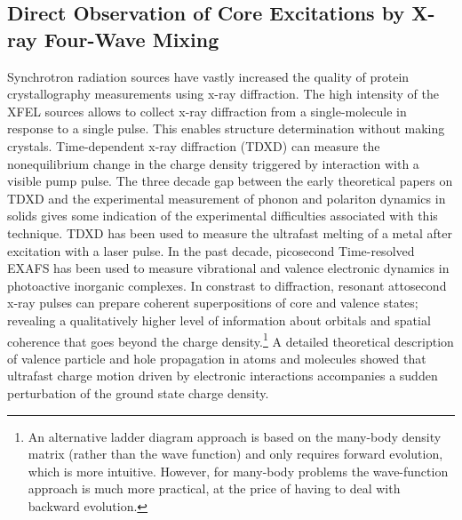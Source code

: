 \documentclass{ar-1col}
\begin{document}
\subsection{Direct Observation of Core Excitations by X-ray Four-Wave Mixing}
Synchrotron radiation sources have
vastly increased the quality of protein crystallography measurements
using x-ray diffraction.\cite{deisenhofer_structure_1985} The high
intensity of the XFEL sources allows to collect x-ray diffraction
from a single-molecule in response to a single pulse. This enables
structure determination without making crystals.\cite{chapman_femtosecond_2011} Time-dependent x-ray diffraction
(TDXD) can measure the nonequilibrium change in the charge density
triggered by interaction with a visible pump pulse.\cite{bargheer_coherent_2004,elsaesser_transient_2012} The three
decade gap between the early theoretical papers on
TDXD\cite{freund_optically_1970,eisenberger_mixing_1971,woo_inelastic_1972,freund_nonlinear_1972a}
and the experimental measurement of
phonon\cite{lindenberg_time-resolved_2000} and
polariton\cite{cavalleri_tracking_2006} dynamics in solids gives some
indication of the experimental difficulties associated with this
technique. TDXD has been used to measure the ultrafast melting of a
metal after excitation with a laser
pulse.\cite{chen_time-resolved_2011} In the past decade, picosecond
Time-resolved EXAFS has
been used to measure vibrational and valence electronic dynamics in
photoactive inorganic complexes.\cite{bressler_ultrafast_2004}
In constrast to diffraction, resonant attosecond x-ray pulses can
prepare coherent superpositions of core and valence states; revealing
a qualitatively higher level of information about orbitals and spatial
coherence that goes beyond the charge density.\footnote{An alternative ladder diagram approach is based on the many-body density matrix (rather than the wave function) and only requires forward evolution, which is more intuitive. However, for many-body problems the wave-function approach is much more practical, at the price of having to deal with backward evolution.}  A detailed theoretical
description of valence particle and hole propagation in atoms and
molecules showed that ultrafast charge motion driven by electronic
interactions accompanies a sudden perturbation of the ground state
charge
density. \cite{breidbach_universal_2005}


\begin{marginnote}
\end{marginnote}
\end{document}
